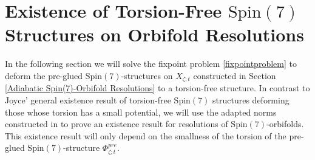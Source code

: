 \documentclass[psamsfonts]{amsart}
\theoremstyle{plain}
\theoremstyle{definition}{
\newtheorem{defi}{Definition}[section]
\newtheorem{ass}{Assumption}
\newtheorem*{nota}{Notation}}
\theoremstyle{remark}{
\newtheorem{rem}{Remark}
\newtheorem{ex}{Example}}
\theoremstyle{plain}{
\newtheorem{thm}{Theorem}[section]
\newtheorem{lem}{Lemma}[section]
\newtheorem{cor}{Corollary}[section]
\newtheorem{prop}{Proposition}[section]
\newtheorem{con}{Conjecture}[section]}
\newcommand{\m}[1]{{\mathrm{#1}}}
\begin{document}





\section{Existence of Torsion-Free $\m{Spin}(7)$ Structures on Orbifold Resolutions}
\label{Existence of torsion-free Spin(7) Structures on Orbifold Resolutions}

In the following section we will solve the fixpoint problem \eqref{fixpointproblem} to deform the pre-glued $\m{Spin}(7)$-structures on $X_{\zeta;t}$ constructed in Section \ref{Adiabatic Spin(7)-Orbifold Resolutions} to a torsion-free structure. In contrast to Joyce' general existence result of torsion-free $\m{Spin}(7)$ structures deforming those whose torsion has a small potential, we will use the adapted norms constructed in \cite{majewskiDirac} to prove an existence result for resolutions of $\m{Spin}(7)$-orbifolds. This existence result will only depend on the smallness of the torsion of the pre-glued $\m{Spin}(7)$-structure $\Phi^{pre}_{\zeta;t}$.
\end{document}
